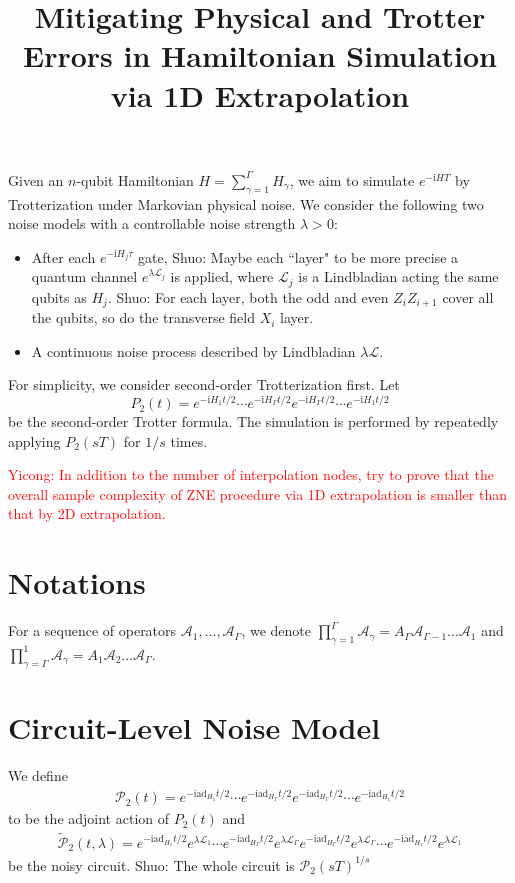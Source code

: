\documentclass[11pt]{article}
\title{Mitigating Physical and Trotter Errors in Hamiltonian Simulation via 1D Extrapolation
}
\author{}
\date{}
\renewcommand{\i}{\mathrm{i}}
\renewcommand{\L}{\mathcal{L}}
\newcommand{\ad}{\mathrm{ad}}
\renewcommand{\P}{\mathcal{P}}
\newcommand{\A}{\mathcal{A}}
\newcommand{\sz}[1]{{\color{blue} Shuo: #1}}
\begin{document}
\maketitle
Given an $n$-qubit Hamiltonian $H = \sum_{\gamma=1}^{\Gamma} H_{\gamma}$, we aim to simulate $e^{-\i H T}$ by Trotterization under Markovian physical noise. We consider the following two noise models with a controllable noise strength $\lambda >0$:
\begin{itemize}
    \item After each $e^{-\i H_j \tau}$ gate, \sz{Maybe each ``layer" to be more precise} a quantum channel $e^{\lambda\L_j}$ is applied, where $\L_j$ is a Lindbladian acting the same qubits as $H_j$. \sz{For each layer, both the odd and even $Z_iZ_{i+1}$ cover all the qubits, so do the transverse field $X_i$ layer.}
    \item A continuous noise process described by Lindbladian $\lambda\L$.
\end{itemize}
For simplicity, we consider second-order Trotterization first. Let \[
P_2(t)=e^{-\i H_1 t/2}\cdots e^{-\i H_{\Gamma} t/2} e^{-\i H_{\Gamma} t/2} \cdots e^{-\i H_1 t/2}
\] be the second-order Trotter formula. The simulation is performed by repeatedly applying $P_2(sT)$ for $1/s$ times. 

\textcolor{red}{Yicong: In addition to the number of interpolation nodes, try to prove that the overall sample complexity of ZNE procedure via 1D extrapolation is smaller than that by 2D extrapolation.}

\section{Notations}
For a sequence of operators $\A_1, \ldots, \A_{\Gamma}$, we denote $\prod_{\gamma=1}^\Gamma \A_{\gamma}= A_{\Gamma}\A_{\Gamma-1} \ldots \A_1$ and $\prod_{\gamma=\Gamma}^1 \A_{\gamma}= A_{1}\A_{2} \ldots \A_\Gamma$.
\section{Circuit-Level Noise Model}
We define \begin{align*}
    \P_2(t)=e^{-\i \ad_{H_1} t/2}\cdots e^{-\i \ad_{H_\Gamma} t/2} e^{-\i \ad_{H_\Gamma} t/2} \cdots e^{-\i \ad_{H_1}  t/2}
\end{align*}
to be the adjoint action of $P_2(t)$ and \begin{align*}
    \tilde{\P}_2(t,\lambda)=e^{-\i \ad_{H_1} t/2} e^{\lambda \L_1}\cdots e^{-\i \ad_{H_\Gamma} t/2}e^{\lambda \L_\Gamma} e^{-\i \ad_{H_\Gamma} t/2} e^{\lambda \L_\Gamma}\cdots e^{-\i \ad_{H_1}  t/2}e^{\lambda \L_1}
\end{align*}
be the noisy circuit. \sz{The whole circuit is $\P_2(sT)^{1/s}$}
\end{document}
